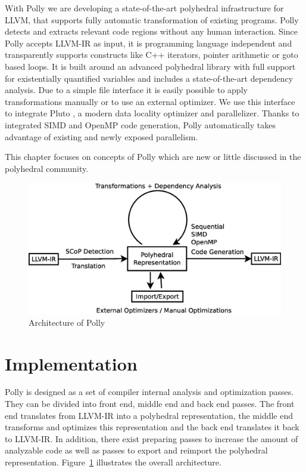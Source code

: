 With Polly we are developing a state-of-the-art polyhedral infrastructure for
LLVM, that supports fully automatic transformation of existing programs. Polly
detects and extracts relevant code regions without any human interaction. Since
Polly accepts LLVM-IR as input, it is programming language independent and
transparently supports constructs like C++ iterators, pointer arithmetic or
goto based loops. It is built around an advanced polyhedral library with full
support for existentially quantified variables and includes a state-of-the-art
dependency analysis. Due to a simple file interface it is easily possible to
apply transformations manually or to use an external optimizer. We use this
interface to integrate Pluto \cite{uday08pldi}, a modern data locality
optimizer and parallelizer. Thanks to integrated SIMD and OpenMP code
generation, Polly automatically takes advantage of existing and newly exposed
parallelism.

This chapter focuses on concepts of Polly which are new or little discussed in the polyhedral community.

\begin{figure}
  \label{fig:arch}
  \includegraphics[width=1\textwidth]{images/architecture.eps}
  \caption{Architecture of Polly}
\end{figure}

\section{Implementation}

Polly is designed as a set of compiler internal analysis and optimization
passes. They can be divided into front end, middle end and back end passes. The
front end translates from LLVM-IR into a polyhedral representation, the middle
end transforms and optimizes this representation and the back end translates it
back to LLVM-IR. In addition, there exist preparing passes to increase the
amount of analyzable code as well as passes to export and reimport the polyhedral
representation.  Figure~\ref{fig:arch} illustrates the overall
architecture.

